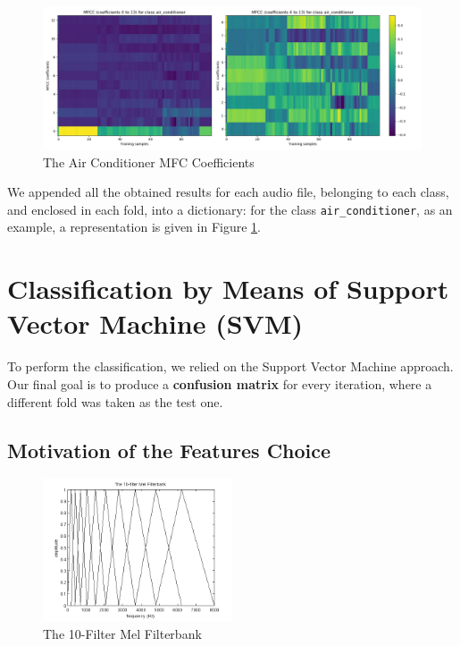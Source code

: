 \documentclass[11pt]{article}
\begin{document}
\begin{figure}
\centering
\includegraphics[width=1\textwidth]{AirCon}
\caption{The Air Conditioner MFC Coefficients}
\label{fig:AirCon}
\end{figure}

We appended all the obtained results for each audio file, belonging to each class, and enclosed in each fold, into a dictionary: for the class \texttt{air{\_}conditioner}, as an example, a representation is given in Figure \ref{fig:AirCon}.

\section{Classification by Means of Support Vector Machine (SVM)}
To perform the classification, we relied on the Support Vector Machine approach. Our final goal is to produce a \textbf{confusion matrix} for every iteration, where a different fold was taken as the test one.

\subsection{Motivation of the Features Choice}

\begin{figure}
\centering
\includegraphics[width=0.5\textwidth]{A-Mel-filterbank-containing-10-filters}
\caption{The 10-Filter Mel Filterbank}
\label{fig:MFCC-graph}
\end{figure}
\end{document}
